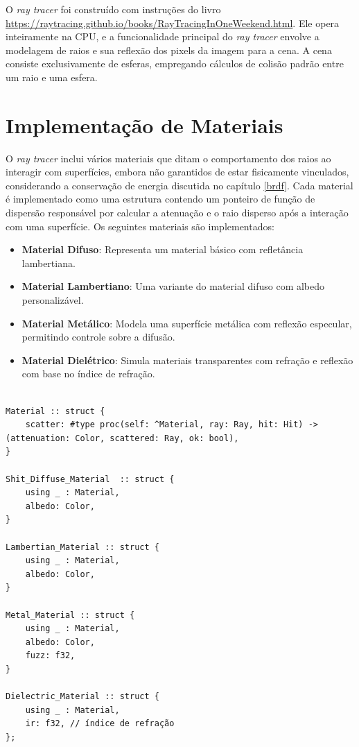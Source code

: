 \documentclass[english, 
               brazil, 
               bsc] %
               {dcomp-abntex2}
\begin{document}
O \textit{ray tracer} foi construído com instruções do livro \url{https://raytracing.github.io/books/RayTracingInOneWeekend.html}. Ele opera inteiramente na CPU, e a funcionalidade principal do \textit{ray tracer} envolve a modelagem de raios e sua reflexão dos pixels da imagem para a cena. A cena consiste exclusivamente de esferas, empregando cálculos de colisão padrão entre um raio e uma esfera.

\section{Implementação de Materiais}

O \textit{ray tracer} inclui vários materiais que ditam o comportamento dos raios ao interagir com superfícies, embora não garantidos de estar fisicamente vinculados, considerando a conservação de energia discutida no capítulo \ref{brdf}. Cada material é implementado como uma estrutura contendo um ponteiro de função de dispersão responsável por calcular a atenuação e o raio disperso após a interação com uma superfície. Os seguintes materiais são implementados:

\begin{itemize}
\item \textbf{Material Difuso}: Representa um material básico com refletância lambertiana.
\item \textbf{Material Lambertiano}: Uma variante do material difuso com albedo personalizável.
\item \textbf{Material Metálico}: Modela uma superfície metálica com reflexão especular, permitindo controle sobre a difusão.
\item \textbf{Material Dielétrico}: Simula materiais transparentes com refração e reflexão com base no índice de refração.
\end{itemize}

\begin{verbatim}

Material :: struct {
    scatter: #type proc(self: ^Material, ray: Ray, hit: Hit) -> (attenuation: Color, scattered: Ray, ok: bool),
}

Shit_Diffuse_Material  :: struct {
    using _ : Material,
    albedo: Color,
}

Lambertian_Material :: struct {
    using _ : Material,
    albedo: Color,
}

Metal_Material :: struct {
    using _ : Material,
    albedo: Color,
    fuzz: f32,
}

Dielectric_Material :: struct {
    using _ : Material,
    ir: f32, // índice de refração
};
\end{verbatim}
\end{document}
